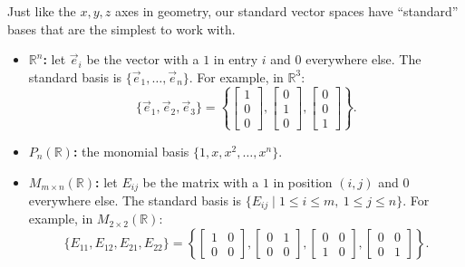 Just like the $x, y, z$ axes in geometry, our standard vector spaces have ``standard'' bases that are the simplest to work with.

\begin{definition}
\begin{itemize}
    \item \textbf{$\mathbb{R}^n$:} let $\vec{e}_i$ be the vector with a $1$ in entry $i$ and $0$ everywhere else. The standard basis is $\{\vec{e}_1, \dots, \vec{e}_n\}$. For example, in $\mathbb{R}^3$:
    \[
    \{\vec{e}_1, \vec{e}_2, \vec{e}_3\} = \left\{ \begin{bmatrix} 1 \\ 0 \\ 0 \end{bmatrix}, \begin{bmatrix} 0 \\ 1 \\ 0 \end{bmatrix}, \begin{bmatrix} 0 \\ 0 \\ 1 \end{bmatrix} \right\}.
    \]
    \item \textbf{$P_n(\mathbb{R})$:} the monomial basis $\{1, x, x^2, \dots, x^n\}$.
    \item \textbf{$M_{m \times n}(\mathbb{R})$:} let $E_{ij}$ be the matrix with a $1$ in position $(i, j)$ and $0$ everywhere else. The standard basis is $\{E_{ij} \mid 1 \le i \le m, \ 1 \le j \le n\}$. For example, in $M_{2 \times 2}(\mathbb{R})$:
    \[
    \{E_{11}, E_{12}, E_{21}, E_{22}\} = \left\{
    \begin{bmatrix} 1 & 0 \\ 0 & 0 \end{bmatrix},
    \begin{bmatrix} 0 & 1 \\ 0 & 0 \end{bmatrix},
    \begin{bmatrix} 0 & 0 \\ 1 & 0 \end{bmatrix},
    \begin{bmatrix} 0 & 0 \\ 0 & 1 \end{bmatrix}
    \right\}.
    \]
\end{itemize}
\end{definition}

